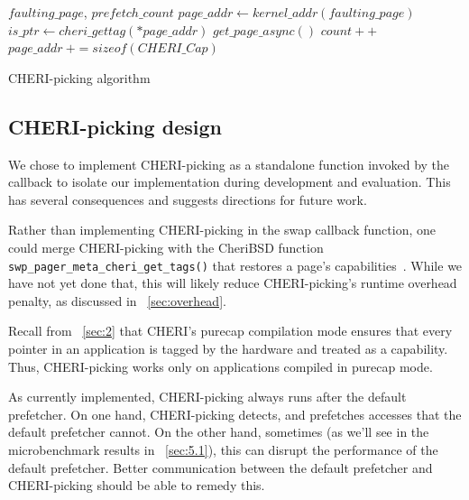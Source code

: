 \begin{algorithm}
\begin{algorithmic}[1]
\Require $faulting\_page$, $prefetch\_count$
\State $page\_addr \gets kernel\_addr(faulting\_page)$
    \State $is\_ptr \gets cheri\_gettag(*page\_addr)$
                \State $get\_page\_async()$
                \State $count++$
            \EndIf
        \EndIf
    \EndIf
    \State $page\_addr~+= sizeof(CHERI\_Cap)$ 
\EndWhile
\end{algorithmic}
\caption{CHERI-picking algorithm}\label{alg:cheri}
\label{alg_1}
\end{algorithm}

\subsection{CHERI-picking design}
\label{sec:DI_CP_design}
We chose to implement CHERI-picking as a standalone function invoked by the callback to isolate our implementation during development and evaluation.
This has several consequences and suggests directions for future work.

Rather than implementing CHERI-picking in the swap callback function, one could merge CHERI-picking with the CheriBSD function 
\texttt{swp\_pager\_meta\_cheri\_get\_tags()} that restores a page's capabilities~\cite{cheri_get_tags}.
While we have not yet done that, this will likely reduce CHERI-picking's runtime overhead penalty, as discussed in
~\autoref{sec:overhead}.

Recall from ~\autoref{sec:2} that CHERI’s purecap compilation mode ensures that every pointer in an application is tagged by the hardware and treated as a capability. Thus, CHERI-picking works only on applications compiled in purecap mode.

As currently implemented, CHERI-picking always runs after the default prefetcher. 
On one hand, CHERI-picking detects, and prefetches accesses that the default prefetcher cannot. 
On the other hand, sometimes (as we’ll see in the microbenchmark results in ~\autoref{sec:5.1}), this can disrupt the performance of the default prefetcher.
Better communication between the default prefetcher and CHERI-picking should be able to remedy this.


